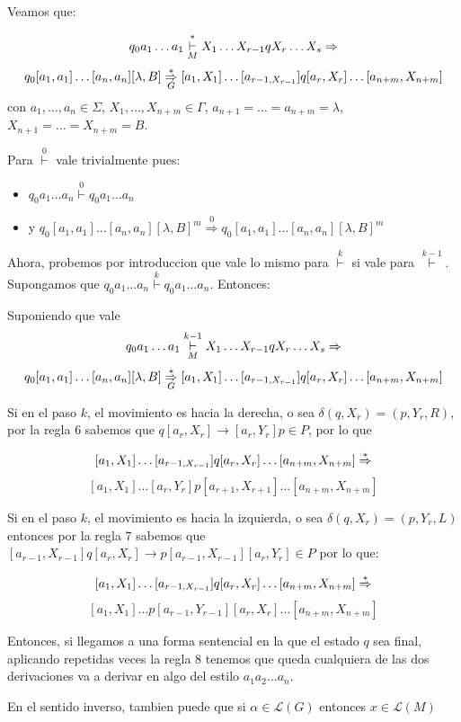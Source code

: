 \begin{demoPart}[0.9\textwidth]
  Veamos que:

  \[ q_0a_1\dots a_1\overset{*}{\underset{M}{\vdash}} X_1\dots X_{r-1}qX_r\dots X_s\Rightarrow \]
  \[q_0[a_1,a_1]\dots[a_n,a_n][\lambda, B]\underset{G}{\overset{*}{\Rightarrow}} [a_1,X_1]\dots[a_{r-1,X_{r-1}}]q[a_r,X_r]\dots[a_{n+m},X_{n+m}]\]
  con \(a_1,\dots,a_n\in\Sigma\), \(X_1,\dots,X_{n+m}\in\Gamma\), \(a_{n+1} = \dots = a_{n+m} = \lambda\), \(X_{n+1} = \dots = X_{n+m} = B\).


  Para \(\overset{0}{\vdash}\) vale trivialmente pues:
  \begin{itemize}
    \item \(q_0a_1\dots a_n\overset{0}{\vdash} q_0a_1\dots a_n\)
    \item y \(q_0[a_1,a_1]\dots[a_n,a_n][\lambda, B]^m\overset{0}{\Rightarrow} q_0[a_1,a_1]\dots[a_n,a_n][\lambda, B]^m \)
  \end{itemize}

  Ahora, probemos por introduccion que vale lo mismo para \(\overset{k}{\vdash}\) si vale para \(\overset{k-1}{\vdash}\). Supongamos que \(q_0a_1\dots a_n\overset{k}{\vdash} q_0a_1\dots a_n\). Entonces:
\end{demoPart}
\begin{demoPart}[0.8\textwidth]
  Suponiendo que vale
  \[ q_0a_1\dots a_1\overset{k-1}{\underset{M}{\vdash}} X_1\dots X_{r-1}qX_r\dots X_s\Rightarrow \]
  \[q_0[a_1,a_1]\dots[a_n,a_n][\lambda, B]\underset{G}{\overset{*}{\Rightarrow}} [a_1,X_1]\dots[a_{r-1,X_{r-1}}]q[a_r,X_r]\dots[a_{n+m},X_{n+m}]\]

  Si en el paso \(k\), el movimiento es hacia la derecha, o sea \(\delta(q,X_r) = (p, Y_r, R)\), por la regla 6 sabemos que \(q[a_r,X_r]\to[a_r, Y_r]p\in P\), por lo que

  \[[a_1,X_1]\dots[a_{r-1,X_{r-1}}]q[a_r,X_r]\dots[a_{n+m},X_{n+m}]\overset{*}{\Rightarrow}\]
  \[ [a_1,X_1]\dots[a_{r},Y_{r}]p[a_{r+1},X_{r+1}]\dots[a_{n+m},X_{n+m}]\]

  Si en el paso \(k\), el movimiento es hacia la izquierda, o sea \(\delta(q,X_r) = (p, Y_r, L)\) entonces por la regla 7 sabemos que \([a_{r-1}, X_{r-1}]q[a_r,X_r]\to p[a_{r-1}, X_{r-1}][a_r, Y_r]\in P\) por lo que:

  \[[a_1,X_1]\dots[a_{r-1,X_{r-1}}]q[a_r,X_r]\dots[a_{n+m},X_{n+m}]\overset{*}{\Rightarrow}\]
  \[ [a_1,X_1]\dots p[a_{r-1},Y_{r-1}][a_{r},X_{r}]\dots[a_{n+m},X_{n+m}]\]

  Entonces, si llegamos a una forma sentencial en la que el estado \(q\) sea final, aplicando repetidas veces la regla 8 tenemos que queda cualquiera de las dos derivaciones va a derivar en algo del estilo \(a_1 a_2\dots a_n\).

  En el sentido inverso, tambien puede  que si \(\alpha\in\mathcal{L}(G)\) entonces \(x\in\mathcal{L}(M)\)
\end{demoPart}

